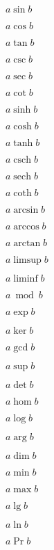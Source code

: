 \documentclass{article}
\DeclareMathOperator{\sech}{sech}
\DeclareMathOperator{\csch}{csch}
\begin{document}
\(a \sin b\)

\(a \cos b\)

\(a \tan b\)

\(a \csc b\)

\(a \sec b\)

\(a \cot b\)

\(a \sinh b\)

\(a \cosh b\)

\(a \tanh b\)

\(a \csch b\)

\(a \sech b\)

\(a \coth b\)

\(a \arcsin b\)

\(a \arccos b\)

\(a \arctan b\)

\(a \limsup b\)

\(a \liminf b\)

\(a \bmod b\)

\(a \exp b\)

\(a \ker b\)

\(a \gcd b\)

\(a \sup b\)

\(a \det b\)

\(a \hom b\)

\(a \log b\)

\(a \arg b\)

\(a \dim b\)

\(a \min b\)

\(a \max b\)

\(a \lg b\)

\(a \ln b\)

\(a \Pr b\)
\end{document}
